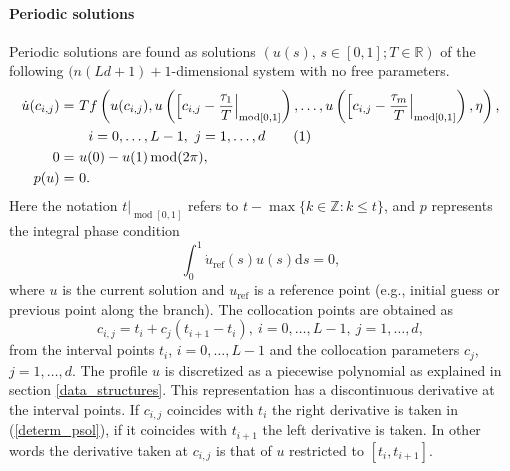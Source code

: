 \documentclass[10pt]{scrartcl}
\renewcommand{\d}{\mathrm{d}}
\newcommand{\RR}{\mathbb{R}}
\newcommand{\ZZ}{\mathbb{Z}}
\renewcommand{\mod}{\operatorname{mod}}
\newcommand\numberthis{\addtocounter{equation}{1}\tag{\theequation}}
\begin{document}
{\paragraph{Periodic solutions}
Periodic solutions are found as solutions $(u(s),\,s\in[0,1];T\in\RR)$
of the following $(n(Ld+1)+1$-dimensional system with no free
parameters.
\begin{align*}\label{determ_psol}
\dot{u}(c_{i,j})=&\
Tf\left(u(c_{i,j}),u\left(\left[c_{i,j}-\frac{\tau_1}{T}\right\vert_{\mod[0,1]}\right),\ldots,
u\left(\left[c_{i,j}-\frac{\tau_m}{T}\right\vert_{\mod[0,1]}\right),\eta\right)\mbox{,}\\
&\quad i=0,\ldots,L-1,\ j=1,\ldots,d \numberthis\\
0=&\ u(0)-u(1)\mod(2\pi), \\
p(u)=&\ 0.
\end{align*}
Here the notation $t\vert_{\mod[0,1]}$ refers to
$t-\max\{k\in\ZZ:k\leq t\}$, and $p$ represents the integral phase
condition
\begin{equation}\label{integral_phase_cond}
\int_0^1\dot{u}_\mathrm{ref}(s) u(s)\d s=0,
\end{equation}
where $u$ is the current solution and $u_\mathrm{ref}$ is a reference point (e.g., initial guess or previous point along the branch).
The collocation points are obtained as 
\[
c_{i,j}=t_i+c_j(t_{i+1}-t_i),\ i=0,\ldots,L-1,\ j=1,\ldots,d,
\]
from the interval points $t_i$, $i=0,\ldots,L-1$ and the collocation
parameters $c_j$, $j=1,\ldots,d$.  The profile $u$ is discretized as a
piecewise polynomial as explained in section \ref{data_structures}.
This representation has a discontinuous derivative at the interval
points. If $c_{i,j}$ coincides with $t_i$ the right derivative is
taken in (\ref{determ_psol}), if it coincides with $t_{i+1}$ the left
derivative is taken. In other words the derivative taken at $c_{i,j}$
is that of $u$ restricted to $[t_i,t_{i+1}]$.

}
\end{document}
